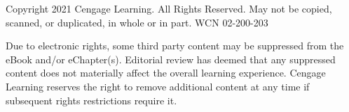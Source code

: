 \vfill
\noindent
\begin{minipage}{\linewidth}
    \fontsize{6.5pt}{7.5pt}\selectfont\color{stewartdarkgray}
    Copyright 2021 Cengage Learning. All Rights Reserved. May not be copied, scanned, or duplicated, in whole or in part. WCN 02-200-203

    Due to electronic rights, some third party content may be suppressed from the eBook and/or eChapter(s). Editorial review has deemed that any suppressed content does not materially affect the overall learning experience. Cengage Learning reserves the right to remove additional content at any time if subsequent rights restrictions require it.
\end{minipage}
